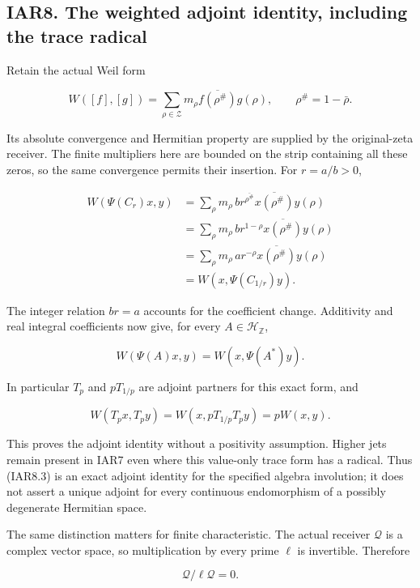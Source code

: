 \documentclass[
]{article}
\begin{document}
\subsection{IAR8. The weighted adjoint identity, including the trace
radical}\label{iar8.-the-weighted-adjoint-identity-including-the-trace-radical}

Retain the actual Weil form

\[
W([f],[g])=\sum_{\rho\in\mathscr Z}m_\rho
\overline{f(\rho^\#)}g(\rho),
\qquad \rho^\#=1-\bar\rho.
\tag{IAR8.1}
\]

Its absolute convergence and Hermitian property are supplied by the
original-zeta receiver. The finite multipliers here are bounded on the
strip containing all these zeros, so the same convergence permits their
insertion. For \(r=a/b>0\),

\[
\begin{aligned}
W(\Psi(C_r)x,y)
&=\sum_\rho m_\rho\,b r^{\overline{\rho^\#}}
\overline{x(\rho^\#)}y(\rho)\\
&=\sum_\rho m_\rho\,b r^{1-\rho}
\overline{x(\rho^\#)}y(\rho)\\
&=\sum_\rho m_\rho\,a r^{-\rho}
\overline{x(\rho^\#)}y(\rho)\\
&=W(x,\Psi(C_{1/r})y).
\end{aligned}
\tag{IAR8.2}
\]

The integer relation \(br=a\) accounts for the coefficient change.
Additivity and real integral coefficients now give, for every
\(A\in\mathcal H_{\mathbb Z}\),

\[
\boxed{W(\Psi(A)x,y)=W(x,\Psi(A^*)y).}
\tag{IAR8.3}
\]

In particular \(T_p\) and \(pT_{1/p}\) are adjoint partners for this
exact form, and

\[
W(T_px,T_py)=W(x,pT_{1/p}T_py)=pW(x,y).
\tag{IAR8.4}
\]

This proves the adjoint identity without a positivity assumption. Higher
jets remain present in IAR7 even where this value-only trace form has a
radical. Thus (IAR8.3) is an exact adjoint identity for the specified
algebra involution; it does not assert a unique adjoint for every
continuous endomorphism of a possibly degenerate Hermitian space.

The same distinction matters for finite characteristic. The actual
receiver \(\mathcal Q\) is a complex vector space, so multiplication by
every prime \(\ell\) is invertible. Therefore

\[
\mathcal Q/\ell\mathcal Q=0.
\tag{IAR8.5}
\]
\end{document}
